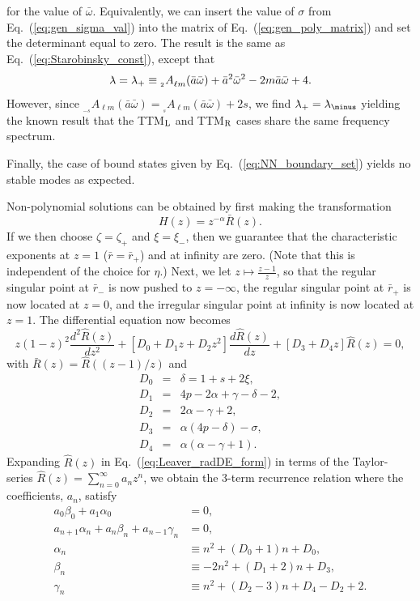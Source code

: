 \documentclass[11pt]{article}
\makeatletter
\newcommand{\scA}[4][]{{}_{{}_{#2}}A^{#1}_{#3}(#4)}
\def\lambdabar{\protect\@lambdabar}
\def\@lambdabar{%
\relax
\bgroup
\def\@tempa{\hbox{\raise.73\ht0
\hbox to0pt{\kern.25\wd0\vrule width.5\wd0
height.1pt depth.1pt\hss}\box0}}%
\mathchoice{\setbox0\hbox{$\displaystyle\lambda$}\@tempa}%
{\setbox0\hbox{$\textstyle\lambda$}\@tempa}%
{\setbox0\hbox{$\scriptstyle\lambda$}\@tempa}%
{\setbox0\hbox{$\scriptscriptstyle\lambda$}\@tempa}%
\egroup
}
\makeatother
\begin{document}
for the value of $\bar\omega$.  Equivalently, we can insert the value
of $\sigma$ from Eq.~(\ref{eq:gen_sigma_val}) into the matrix of
Eq.~(\ref{eq:gen_poly_matrix}) and set the determinant equal to zero.
The result is the same as Eq.~(\ref{eq:Starobinsky_const}), except
that
\begin{equation}
  \lambdabar=\lambdabar_+\equiv \scA{2}{\ell{m}}{\bar{a}\bar\omega}
     + \bar{a}^2\bar\omega^2 - 2m\bar{a}\bar\omega+4.
\end{equation}
However, since
$\scA{-s}{\ell{m}}{\bar{a}\bar\omega}=\scA{s}{\ell{m}}{\bar{a}\bar\omega}+2s$,
we find $\lambdabar_+=\lambdabar_\minus$ yielding the known result
that the TTM${}_{\rm L}$ and TTM${}_{\rm R}$ cases share the same
frequency spectrum.

Finally, the case of bound states given by Eq.~(\ref{eq:NN_boundary_set})
yields no stable modes as expected.



\vspace{0.25in}
Non-polynomial solutions can be obtained by first making the transformation
\begin{equation}
  H(z) = z^{-\alpha}\bar{R}(z).
\end{equation}
If we then choose $\zeta=\zeta_+$ and $\xi=\xi_\minus$, then we
guarantee that the characteristic exponents at $z=1$
($\bar{r}=\bar{r}_+$) and at infinity are zero.  (Note that this is
independent of the choice for $\eta$.)  Next, we let
$z\mapsto\frac{z-1}{z}$, so that the regular singular point at
$\bar{r}_\minus$ is now pushed to $z=-\infty$, the regular singular
point at $\bar{r}_+$ is now located at $z=0$, and the irregular
singular point at infinity is now located at $z=1$.  The differential
equation now becomes
\begin{equation}\label{eq:Leaver_radDE_form}
  z(1-z)^2\frac{d^2\hat{R}(z)}{dz^2} 
     + \left[D_0 + D_1z + D_2z^2\right]\frac{d\hat{R}(z)}{dz} 
     + \left[D_3 + D_4z\right]\hat{R}(z) = 0,
\end{equation}
with $\bar{R}(z)=\hat{R}((z-1)/z)$ and
\begin{eqnarray}
  D_0 &=& \delta = 1+s+2\xi, \\
  D_1 &=& 4p-2\alpha+\gamma-\delta-2, \\
  D_2 &=& 2\alpha-\gamma+2, \\
  D_3 &=& \alpha(4p-\delta)-\sigma, \\
  D_4 &=& \alpha(\alpha-\gamma+1).
\end{eqnarray}
Expanding $\hat{R}(z)$ in Eq.~(\ref{eq:Leaver_radDE_form}) in terms of
the Taylor-series $\hat{R}(z)=\sum_{n=0}^\infty{a_nz^n}$, we obtain
the 3-term recurrence relation where the coefficients, $a_n$, satisfy
\begin{align}\label{eq:Leaver_rad_2-term}
  a_0\beta_0 + a_1\alpha_0 &= 0, \\ \label{eq:Leaver_rad_3-term}
  a_{n+1}\alpha_n + a_n\beta_n + a_{n-1}\gamma_n &=0, \\
  \alpha_n &\equiv n^2 + (D_0+1)n + D_0, \\
  \beta_n &\equiv -2n^2 + (D_1+2)n + D_3, \\
  \gamma_n &\equiv n^2 + (D_2-3)n +D_4 - D_2 +2.
\end{align}
\end{document}
